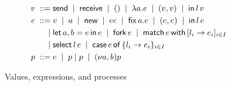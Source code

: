 \begin{figure}[t]
  \begin{align*}
    v \grmeq& \sendk %
    \grmor \recvk
    \grmor ()
    \grmor \lambda a.e
    \grmor (v,v)
    \grmor \inject lv
    \\
    e \grmeq& v %
    \grmor a
    \grmor \newk
    \grmor ee
    \grmor \fix ae
    \grmor (e,e)
    \grmor \ink\,l\,e\\
    \grmor& \letin{a,b} e e
    \grmor \forkk\, e
    \grmor \match e {l_i\rightarrow e_i}_{i\in I}\\
    \grmor& \select le
    \grmor \casek\,e\,\ofk\,\{l_i\rightarrow e_i\}_{i\in I}
    \\
    p \grmeq& e %
    \grmor p \PAR p
    \grmor (\nu a,b)p
  \end{align*}
  \caption{Values, expressions, and processes}
  \label{fig:processes}
\end{figure}

